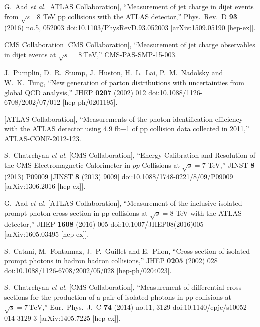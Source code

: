 \documentclass{PoS}
\begin{document}
\begin{thebibliography}{99}
  G.~Aad {\it et al.} [ATLAS Collaboration],
  ``Measurement of jet charge in dijet events from $\sqrt{s}$=8  TeV pp collisions with the ATLAS detector,''
  Phys.\ Rev.\ D {\bf 93} (2016) no.5,  052003
  doi:10.1103/PhysRevD.93.052003
  [arXiv:1509.05190 [hep-ex]].

  CMS Collaboration [CMS Collaboration],
  ``Measurement of jet charge observables in dijet events at $\sqrt{s}=8~\mathrm{TeV}$,''
  CMS-PAS-SMP-15-003.

  J.~Pumplin, D.~R.~Stump, J.~Huston, H.~L.~Lai, P.~M.~Nadolsky and W.~K.~Tung,
  ``New generation of parton distributions with uncertainties from global QCD analysis,''
  JHEP {\bf 0207} (2002) 012
  doi:10.1088/1126-6708/2002/07/012
  [hep-ph/0201195].

  [ATLAS Collaboration],
  ``Measurements of the photon identification efficiency with the ATLAS detector using 4.9 fb−1 of pp collision data collected in 2011,''
  ATLAS-CONF-2012-123.

  S.~Chatrchyan {\it et al.} [CMS Collaboration],
  ``Energy Calibration and Resolution of the CMS Electromagnetic Calorimeter in $pp$ Collisions at $\sqrt{s} = 7$ TeV,''
  JINST {\bf 8} (2013) P09009
   [JINST {\bf 8} (2013) 9009]
  doi:10.1088/1748-0221/8/09/P09009
  [arXiv:1306.2016 [hep-ex]].

  G.~Aad {\it et al.} [ATLAS Collaboration],
  ``Measurement of the inclusive isolated prompt photon cross section in pp collisions at $ \sqrt{s}=8 $ TeV with the ATLAS detector,''
  JHEP {\bf 1608} (2016) 005
  doi:10.1007/JHEP08(2016)005
  [arXiv:1605.03495 [hep-ex]].

  S.~Catani, M.~Fontannaz, J.~P.~Guillet and E.~Pilon,
  ``Cross-section of isolated prompt photons in hadron hadron collisions,''
  JHEP {\bf 0205} (2002) 028
  doi:10.1088/1126-6708/2002/05/028
  [hep-ph/0204023].

  S.~Chatrchyan {\it et al.} [CMS Collaboration],
  ``Measurement of differential cross sections for the production of a pair of isolated photons in pp collisions at $\sqrt{s}=7\,\text {TeV} $,''
  Eur.\ Phys.\ J.\ C {\bf 74} (2014) no.11,  3129
  doi:10.1140/epjc/s10052-014-3129-3
  [arXiv:1405.7225 [hep-ex]].


\end{thebibliography}
\end{document}

